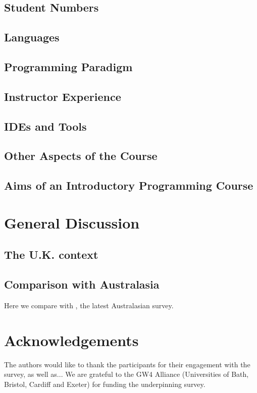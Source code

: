 \documentclass{sig-alternate}
\begin{document}
\subsection{Student Numbers}

\subsection{Languages}

\subsection{Programming Paradigm}

\subsection{Instructor Experience}

\subsection{IDEs and Tools}

\subsection{Other Aspects of the Course}

\subsection{Aims of an Introductory Programming Course}


\section{General Discussion}\label{discussion}

\subsection{The U.K. context}

\subsection{Comparison with Australasia}
Here we compare with \cite{mason+cooper:2014}, the latest Australasian survey.


\section{Acknowledgements}

The authors would like to thank the participants for their engagement
with the survey, as well as...
We are grateful to the GW4 Alliance (Universities of Bath, Bristol, Cardiff and Exeter) for funding the underpinning survey.



\end{document}
